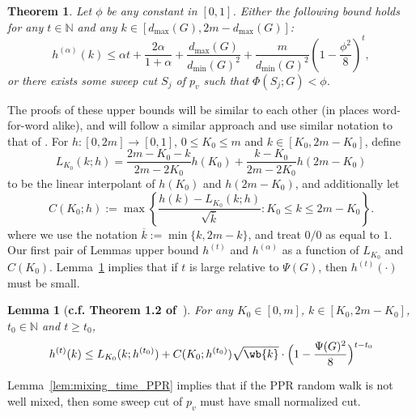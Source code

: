 \documentclass{article}
\newcommand{\set}[1]{\left\{#1\right\}}
\newcommand{\1}{\mathbf{1}}
\newtheorem{theorem}{Theorem}[section]
\newtheorem{lemma}{Lemma}[section]
\theoremstyle{definition}
\theoremstyle{remark}
\begin{document}
\begin{theorem}
	\label{thm:mixing_time_PPR}
	Let $\phi$ be any constant in $[0,1]$. Either the following bound holds for any $t \in \mathbb{N}$ and any $k \in [d_{\max}(G),2m - d_{\max}(G)]$:
	\begin{equation*}
	h^{(\alpha)}(k) \leq \alpha t + \frac{2\alpha}{1 + \alpha} + \frac{d_{\max}(G)}{d_{\min}(G)^2} + \frac{m}{d_{\min}(G)^2} \left(1 - \frac{\phi^2}{8}\right)^{t},
	\end{equation*}
	or there exists some sweep cut $S_j$ of $p_v$ such that $\Phi(S_j;G) < \phi$.
\end{theorem}

The proofs of these upper bounds will be similar to each other (in places word-for-word alike), and will follow a similar approach and use similar notation to that of \citep{lovasz1990,andersen2006}. For $h: [0,2m] \to [0,1]$, $0 \leq K_0 \leq m$ and $k \in [K_0,2m - K_0]$, define
\begin{equation*}
L_{K_0}(k;h) = \frac{2m - K_0 - k}{2m - 2K_0}h(K_0) + \frac{k - K_0}{2m - 2K_0}h(2m - K_0)
\end{equation*}
to be the linear interpolant of $h(K_0)$ and $h(2m - K_0)$, and additionally let
\begin{equation*}
C(K_0;h) := \max\set{\frac{h(k) - L_{K_0}(k;h)}{\sqrt{\overline{k}}}: K_0 \leq k \leq  2m - K_0}.
\end{equation*}
where we use the notation $\overline{k} := \min\{k, 2m - k\}$, and treat $0/0$ as equal to $1$. Our first pair of Lemmas upper bound $h^{(t)}$ and $h^{(\alpha)}$ as a function of $L_{K_0}$ and $C(K_0)$. Lemma~\ref{lem:mixing_random_walk} implies that if $t$ is large relative to $\Psi(G)$, then $h^{(t)}(\cdot)$ must be small.

\begin{lemma}[\textbf{c.f. Theorem 1.2 of~\citep{lovasz1990}}]
	\label{lem:mixing_random_walk}
	For any $K_0 \in [0,m]$, $k \in [K_0, 2m - K_0]$, $t_0 \in \mathbb{N}$ and $t \geq t_0$,
	\begin{equation}
	\label{eqn:mixing_random_walk}
	h^{(t)}(k) \leq L_{K_0}(k;h^{(t_0)}) + C(K_0; h^{(t_0)}) \sqrt{\wb{k}} \cdot \Bigl(1 - \frac{\Psi(G)^2}{8}\Bigr)^{t - t_0}
	\end{equation}
\end{lemma}

Lemma~\ref{lem:mixing_time_PPR} implies that if the PPR random walk is not well mixed, then some sweep cut of $p_v$ must have small normalized cut.
\end{document}

